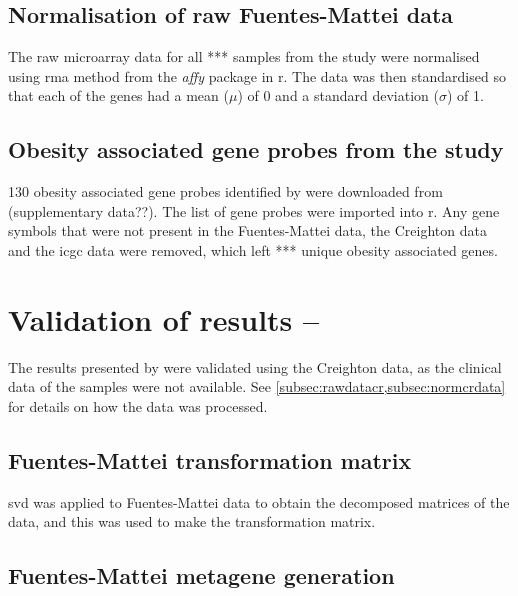 \subsection{Normalisation of raw Fuentes-Mattei data}
\label{subsec:normfmdata}

The raw microarray data for all *** samples from the study were normalised using \gls{rma} method from the \textit{affy} package in \gls{r}.
The data was then standardised so that each of the genes had a mean ($\mu$) of 0 and a standard deviation ($\sigma$) of 1.

\subsection{Obesity associated gene probes from the \citet{Fuentes-Mattei2014} study}
\label{subsec:fmobsgene}

130 obesity associated gene probes identified by \citet{Fuentes-Mattei2014} were downloaded from (supplementary data??).
The list of gene probes were imported into \gls{r}.
Any gene symbols that were not present in the Fuentes-Mattei data, the Creighton data and the \gls{icgc} data were removed, which left *** unique obesity associated genes.

\section{Validation of results -- \citet{Fuentes-Mattei2014}}
\label{sec:valresultsfm}

The results presented by \citet{Fuentes-Mattei2014} were validated using the Creighton data, as the clinical data of the samples were not available.
See \cref{subsec:rawdatacr,subsec:normcrdata} for details on how the data was processed.

\subsection{Fuentes-Mattei transformation matrix}
\label{subsec:transmatfm}

\gls{svd} was applied to Fuentes-Mattei data to obtain the decomposed matrices of the data, and this was used to make the transformation matrix.

\subsection{Fuentes-Mattei metagene generation}
\label{subsec:fmmetagen}

